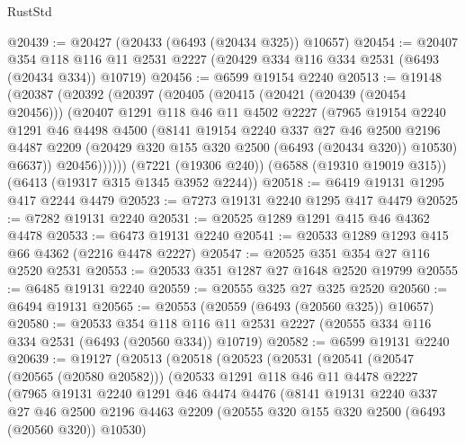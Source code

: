 \begin{lexlean}{RustStd}
\begin{coremodule}
@20439 := @20427 (@20433 (@6493 (@20434 @325)) @10657)
@20454 := @20407
    @354
    @118
    @116
    @11
    @2531
    @2227
    (@20429 @334 @116 @334 @2531 (@6493 (@20434 @334)) @10719)
@20456 := @6599 @19154 @2240
@20513 := @19148
    (@20387
      (@20392
        (@20397
          (@20405
            (@20415
              (@20421 (@20439 (@20454 @20456)))
              (@20407
                @1291
                @118
                @46
                @11
                @4502
                @2227
                (@7965
                  @19154
                  @2240
                  @1291
                  @46
                  @4498
                  @4500
                  (@8141
                    @19154
                    @2240
                    @337
                    @27
                    @46
                    @2500
                    @2196
                    @4487
                    @2209
                    (@20429 @320 @155 @320 @2500 (@6493 (@20434 @320)) @10530)
                    @6637))
                @20456))))))
    (@7221 (@19306 @240))
    (@6588 (@19310 @19019 @315))
    (@6413 (@19317 @315 @1345 @3952 @2244))
@20518 := @6419 @19131 @1295 @417 @2244 @4479
@20523 := @7273 @19131 @2240 @1295 @417 @4479
@20525 := @7282 @19131 @2240
@20531 := @20525 @1289 @1291 @415 @46 @4362 @4478
@20533 := @6473 @19131 @2240
@20541 := @20533 @1289 @1293 @415 @66 @4362 (@2216 @4478 @2227)
@20547 := @20525 @351 @354 @27 @116 @2520 @2531
@20553 := @20533 @351 @1287 @27 @1648 @2520 @19799
@20555 := @6485 @19131 @2240
@20559 := @20555 @325 @27 @325 @2520
@20560 := @6494 @19131
@20565 := @20553 (@20559 (@6493 (@20560 @325)) @10657)
@20580 := @20533
    @354
    @118
    @116
    @11
    @2531
    @2227
    (@20555 @334 @116 @334 @2531 (@6493 (@20560 @334)) @10719)
@20582 := @6599 @19131 @2240
@20639 := @19127
    (@20513
      (@20518
        (@20523
          (@20531
            (@20541
              (@20547 (@20565 (@20580 @20582)))
              (@20533
                @1291
                @118
                @46
                @11
                @4478
                @2227
                (@7965
                  @19131
                  @2240
                  @1291
                  @46
                  @4474
                  @4476
                  (@8141
                    @19131
                    @2240
                    @337
                    @27
                    @46
                    @2500
                    @2196
                    @4463
                    @2209
                    (@20555 @320 @155 @320 @2500 (@6493 (@20560 @320)) @10530)

\end{coremodule}
\end{lexlean}
